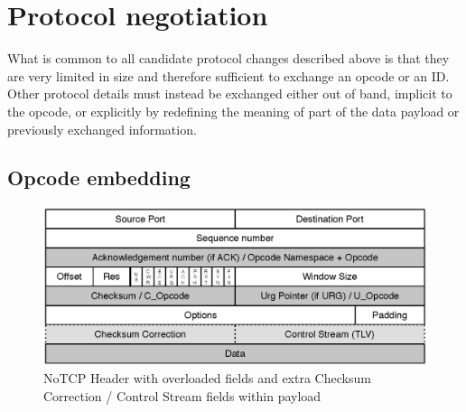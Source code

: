 \documentclass{sig-alternate-10pt}
\begin{document}


\section{Protocol negotiation}
\label{sec:protocol}

What is common to all candidate protocol changes described above is that they are very limited in size and therefore sufficient to exchange an opcode or an ID. Other protocol details must instead be exchanged either out of band, implicit to the opcode, or explicitly by redefining the meaning of part of the data payload or previously exchanged information.

\subsection{Opcode embedding}

\begin{figure}[t!]
\centering
\small{
\includegraphics[width=\columnwidth]{figs/tcp-header}
\caption{NoTCP Header with overloaded fields and extra Checksum Correction / Control Stream fields within payload}
\label{fig:header}
}
\end{figure}
\end{document}
